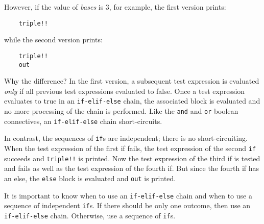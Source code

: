 However, if the value of {\it bases} is 3, for example, the first
version prints:

\begin{verbatim}
    triple!!
\end{verbatim}

while the second version prints:

\begin{verbatim}
    triple!!
    out
\end{verbatim}

Why the difference? In the first version, a subsequent test
expression is evaluated {\it only} if all previous test expressions
evaluated to false. Once a test expression evaluates to true in
an {\tt if-elif-else} chain, the associated block is evaluated and
no more processing of the chain is performed. Like the {\tt and} and
{\tt or} {\sc boolean} connectives,
an {\tt if-elif-else} chain short-circuits.

In contrast, the sequences of {\tt if}s are independent; there is no
short-circuiting. When the test expression of the first if
fails, the test expression of the second {\tt if} succeeds
and {\tt triple!!} is
printed. Now the test expression of the third if is tested and
fails as well as the test expression of the fourth if. But since
the fourth if has an else, the {\tt else} block is evaluated and
{\tt out}
is printed.

It is important to know when to use an {\tt if-elif-else} chain and
when to use a sequence of independent {\tt if}s.
If there should be only
one outcome, then use an {\tt if-elif-else} chain. Otherwise,
use a sequence of {\tt if}s.
